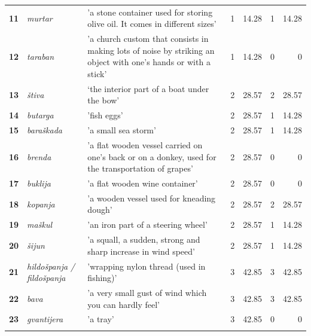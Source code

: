 \documentclass[output=paper]{LSP/langsci}
\begin{document}
\begin{table}
{\begin{tabular}{lp{}p{}lrlr}
{\bfseries 11} & {\itshape murtar} & 'a stone container used for storing olive oil. It comes in different sizes' & 1 & 14.28 & 1 & 14.28\\

{\bfseries 12} & {\itshape taraban} & 'a church custom that consists in making lots of noise by striking an object with one's hands or with a stick' & 1 & 14.28 & 0 & 0\\

{\bfseries 13} & {\itshape štiva} & ‘the interior part of a boat under the bow' & 2 & 28.57 & 2 & 28.57\\

{\bfseries 14} & {\itshape butarga} & 'fish eggs' & 2 & 28.57 & 1 & 14.28\\

{\bfseries 15} & {\itshape baraškada} & 'a small sea storm' & 2 & 28.57 & 1 & 14.28\\

{\bfseries 16} & {\itshape brenda} & 'a flat wooden vessel carried on one's back or on a donkey, used for the transportation of grapes' & 2 & 28.57 & 0 & 0\\

{\bfseries 17} & {\itshape buklija} & 'a flat wooden wine container' & 2 & 28.57 & 0 & 0\\

{\bfseries 18} & {\itshape kopanja} & 'a wooden vessel used for kneading dough' & 2 & 28.57 & 2 & 28.57\\

{\bfseries 19} & {\itshape maškul} & 'an iron part of a steering wheel' \citep[163]{filipi_betinska_1997} & 2 & 28.57 & 1 & 14.28\\

{\bfseries 20} & {\itshape šijun} & 'a squall, a sudden, strong and sharp increase in wind speed' & 2 & 28.57 & 1 & 14.28\\

{\bfseries 21} & {\itshape hildošpanja / fildošpanja} & 'wrapping nylon thread (used in fishing)' & 3 & 42.85 & 3 & 42.85\\

{\bfseries 22} & {\itshape bava} & 'a very small gust of wind which you can hardly feel' & 3 & 42.85 & 3 & 42.85\\

{\bfseries 23} & {\itshape gvantijera} & 'a tray' & 3 & 42.85 & 0 & 0\\

\lspbottomrule
\end{tabular}
}
\end{table}
\end{document}
